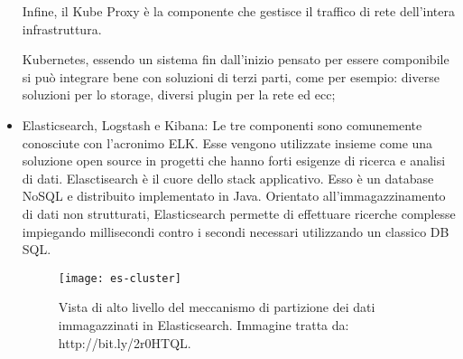 \begin{itemize}
	Infine, il Kube Proxy è la componente che gestisce il traffico di rete 
dell'intera infrastruttura. 
	
    Kubernetes, essendo un sistema fin dall'inizio pensato per essere 
componibile 
    si può integrare bene con soluzioni di terzi parti, come per esempio: 
diverse soluzioni per lo storage, diversi plugin per la rete ed ecc;
	
	\item Elasticsearch, Logstash e Kibana: Le tre componenti sono 
comunemente conosciute con l'acronimo ELK.  Esse vengono utilizzate insieme 
come una soluzione open source in progetti che hanno forti esigenze di ricerca 
e analisi di dati. Elasctisearch è il cuore dello stack applicativo. Esso è un 
database NoSQL e distribuito implementato in Java. Orientato 
all'immagazzinamento di dati non strutturati, Elasticsearch permette di 
effettuare ricerche complesse impiegando millisecondi contro i secondi 
necessari utilizzando un classico DB SQL.
	
	\begin{figure}[htbp]
		\begin{center}
			\texttt{[image: es-cluster]}
			\caption{Vista di alto livello del meccanismo di 
partizione dei dati immagazzinati in Elasticsearch. Immagine tratta da: 
http://bit.ly/2r0HTQL.}
		\end{center}
	\end{figure}


\end{itemize}
